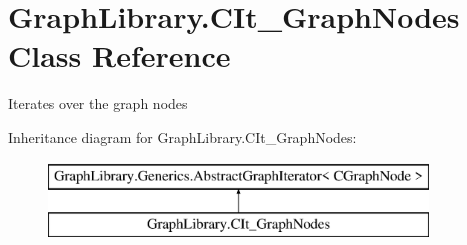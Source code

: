 \hypertarget{class_graph_library_1_1_c_it___graph_nodes}{}\section{Graph\+Library.\+C\+It\+\_\+\+Graph\+Nodes Class Reference}
\label{class_graph_library_1_1_c_it___graph_nodes}


Iterates over the graph nodes  


Inheritance diagram for Graph\+Library.\+C\+It\+\_\+\+Graph\+Nodes\+:\begin{figure}[H]
\begin{center}
\leavevmode
\includegraphics[height=2.000000cm]{class_graph_library_1_1_c_it___graph_nodes}
\end{center}
\end{figure}
